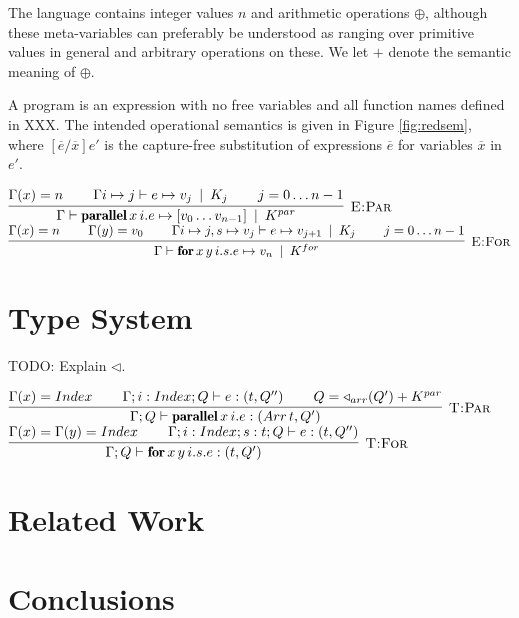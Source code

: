 \documentclass[natbib]{sigplanconf}
\newcommand{\kw}[1]{\mbox{\fontfamily{cmr}\fontseries{b}\selectfont#1}}
\newcommand{\hinfer}[3]{\vcenter{\infer[\DT{#1}]{#2}{#3}}}
\newcommand{\ENV}{\Gamma}
\newcommand{\beval}{\mapsto} %
\newcommand{\ent}{\vdash}
\newcommand{\cost}{\alt}
\newcommand{\nl}{\vspace{2.5ex} \\}
\newcommand{\spc}{\hspace{5ex}}
\newcommand{\shift}{\triangleleft}
\newcommand{\DT}[1]{\mbox{\sc #1}}
\newcommand{\alt}{\;\:\vert\;\:}
\newcommand{\KPAR}{K^{par}}
\newcommand{\KFOR}{K^{for}}
\newcommand{\K}[1]{K_{#1}}
\newcommand{\PARALLEL}{\kw{parallel}\,}
\newcommand{\FOR}{\kw{for}\,}
\newcommand{\ARRAY}[1]{[#1]}
\newcommand{\TINDEX}{Index}
\newcommand{\TARRAY}{Arr\,}
\newcommand{\TENV}{\Gamma}
\begin{document}
The language contains integer values $n$ and arithmetic
operations $\oplus$, although these meta-variables can preferably be
understood as ranging over primitive values in general and arbitrary
operations on these. We let $+$ denote the semantic meaning of
$\oplus$.

A program is an expression with no free variables and all function
names defined in XXX.  The intended operational
semantics is given in Figure \ref{fig:redsem}, where
$[\overline{e}/\overline{x}]e'$ is the capture-free substitution of
expressions $\overline{e}$ for variables $\overline{x}$ in $e'$.

\begin{figure*}
$\hinfer{E:Par}{\ENV \ent \PARALLEL x\,i.e \beval \ARRAY{v_0\ldots v_{n-1}} \cost \KPAR}{\ENV(x) = n \spc \ENV {i \mapsto j} \ent e \beval v_j \cost \K{j} \spc j=0\ldots n-1}$ \nl

$\hinfer{E:For}{\ENV \ent \FOR x\,y\, i.s.e \beval v_n \cost \KFOR}{\ENV(x) = n \spc \ENV(y) = v_0 \spc \ENV {i \mapsto j, s \mapsto v_j} \ent e \beval v_{j+1} \cost \K{j} \spc j=0\ldots n-1}$
\caption{Reduction semantics}
\label{fig:redsem}
\end{figure*}

\section{Type System}

TODO: Explain $\shift$.


\begin{figure*}
$\hinfer{T:Par}{\TENV; Q \ent \PARALLEL x\,i.e : (\TARRAY t, Q')}{\TENV(x) = \TINDEX \spc \TENV;i : \TINDEX; Q \ent e : (t, Q'') \spc Q = \shift_{arr}(Q') + \KPAR}$ \nl

$\hinfer{T:For}{\TENV; Q \ent \FOR x\,y\, i.s.e : (t, Q')}{\TENV(x) = \TENV(y) = \TINDEX \spc \TENV;i:\TINDEX; s:t; Q \ent e : (t, Q'')}$
\caption{Typing Rules}
\label{fig:typesyst}
\end{figure*}

\section{Related Work}

\section{Conclusions}

\acks





\end{document}
